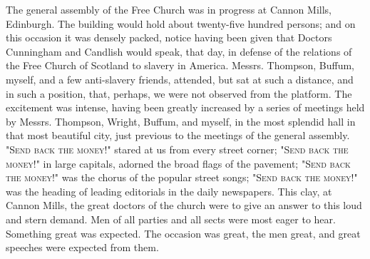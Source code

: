 The general assembly of the Free Church was in progress at Cannon Mills,
Edinburgh. The building would hold about twenty-five hundred persons;
and on this occasion it was densely packed, notice having been given
that Doctors Cunningham and Candlish would speak, that day, in defense
of the relations of the Free Church of Scotland to slavery in America.
Messrs. Thompson, Buffum, myself, and a few anti-slavery friends,
attended, but sat at such a distance, and in such a position, that,
perhaps, we were not observed from the platform. The excitement was
intense, having been greatly increased by a series of meetings held by
Messrs. Thompson, Wright, Buffum, and myself, in the most splendid hall
in that most beautiful city, just previous to the meetings of the
general assembly. "\textsc{Send back the money}!" stared at us from
every street corner; "\textsc{Send back the money}!" in large capitals,
adorned the broad flags of the pavement; "\textsc{Send back the money}!"
was the chorus of the popular street songs; "\textsc{Send back the
money}!" was the heading of leading editorials in the
{\protect\hypertarget{384}{}{}}daily newspapers. This clay, at Cannon
Mills, the great doctors of the church were to give an answer to this
loud and stern demand. Men of all parties and all sects were most eager
to hear. Something great was expected. The occasion was great, the men
great, and great speeches were expected from them.

